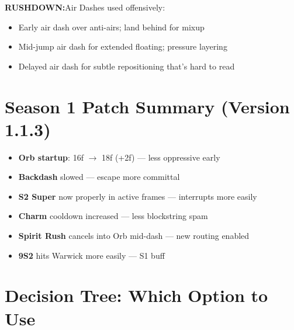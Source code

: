 \documentclass[12pt, a4paper]{report}
\newcommand{\movename}[1]{\textbf{\textcolor{ahriGold}{#1}}}
\newcommand{\rushdown}{\textcolor{ahriMagenta}{\bfseries\sffamily{\small $\blacktriangleright$} RUSHDOWN:}\;}
\begin{document}
\rushdown Air Dashes used offensively:
\begin{itemize}
  \item Early air dash over anti-airs; land behind for mixup
  \item Mid-jump air dash for extended floating; pressure layering
  \item Delayed air dash for subtle repositioning that's hard to read
\end{itemize}

\section{Season 1 Patch Summary (Version 1.1.3)}

\begin{nerfbox}
\begin{itemize}
  \item \movename{Orb startup}: 16f $\to$ 18f (+2f) --- less oppressive early
  \item \movename{Backdash} slowed --- escape more committal
  \item \movename{S2 Super} now properly in active frames --- interrupts more easily
  \item \movename{Charm} cooldown increased --- less blockstring spam
\end{itemize}
\end{nerfbox}

\vspace{6pt}

\begin{buffbox}
\begin{itemize}
  \item \movename{Spirit Rush} cancels into Orb mid-dash --- new routing enabled
  \item \movename{9S2} hits Warwick more easily --- S1 buff
\end{itemize}
\end{buffbox}

\section{Decision Tree: Which Option to Use}
\end{document}
